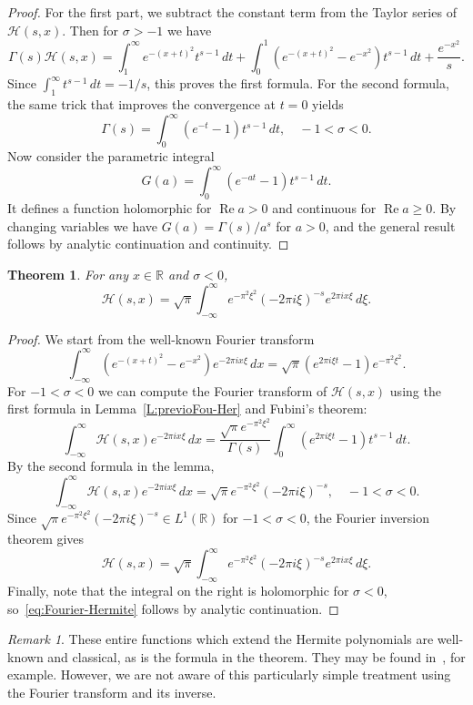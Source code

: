 \documentclass[11pt,a4paper]{amsart}
\newcommand{\R}{\mathbb{R}}
\newcommand{\calH}{\mathcal{H}}
\renewcommand{\Re}{\operatorname{Re}}
\theoremstyle{plain}
\newtheorem{theorem}{Theorem}
\theoremstyle{plain}
\theoremstyle{plain}
\theoremstyle{remark}
\newtheorem*{remark}{Remark}
\begin{document}
\begin{proof}
For the first part, we subtract the constant term from the Taylor series of $\calH(s,x)$. Then for $\sigma > -1$ we have
\[
  \Gamma(s)\calH(s,x) = \int_1^\infty e^{-(x+t)^2}t^{s-1}\,dt
  + \int_0^1 \left(e^{-(x+t)^2}-e^{-x^2}\right)t^{s-1}\,dt + \frac{e^{-x^2}}{s}.
\]
Since $\int_1^\infty t^{s-1}\,dt = -1/s$, this proves the first formula. For the second formula, the same trick that improves the convergence at $t = 0$ yields
\[
  \Gamma(s) = \int_0^\infty (e^{-t}-1)t^{s-1}\,dt,
  \quad -1<\sigma <0.
\]
Now consider the parametric integral
\[
  G(a)=\int_0^\infty (e^{-at}-1)t^{s-1}\,dt.
\]
It defines a function holomorphic for $\Re a> 0$ and continuous for $\Re a\geq 0$. By changing variables we have $G(a)=\Gamma(s)/a^{s}$ for $a>0$, and the general result follows by analytic continuation and continuity.
\end{proof}


\begin{theorem}
\label{T:Fourier-Hermite}
For any $x \in \R$ and $\sigma < 0$,
\begin{equation}
\label{eq:Fourier-Hermite}
  \calH(s,x) = \sqrt{\pi} \int_{-\infty}^\infty e^{-\pi^2\xi^2} (-2\pi i\xi)^{-s}e^{2\pi ix\xi}\,d\xi.
\end{equation}
\end{theorem}

\begin{proof}
We start from the well-known Fourier transform
\[
  \int_{-\infty}^\infty \left(e^{-(x+t)^2}-e^{-x^2}\right)e^{-2\pi ix\xi}\,dx
  = \sqrt{\pi}(e^{2\pi i\xi t}-1)e^{-\pi^2\xi^2}.
\]
For $-1 < \sigma < 0$ we can compute the Fourier transform of $\calH(s,x)$ using the first formula in Lemma~\ref{L:previoFou-Her} and Fubini's theorem:
\[
  \int_{-\infty}^\infty \calH(s,x)e^{-2\pi ix\xi}\,dx
  = \frac{\sqrt{\pi}e^{-\pi^2\xi^2}}{\Gamma(s)} \int_0^\infty (e^{2\pi i\xi t}-1)t^{s-1}\,dt.
\]
By the second formula in the lemma,
\[
  \int_{-\infty}^\infty \calH(s,x)e^{-2\pi ix\xi}\,dx
  = \sqrt{\pi}e^{-\pi^2\xi^2} (-2\pi i\xi)^{-s},
  \quad -1<\sigma<0.
\]
Since $\sqrt{\pi}e^{-\pi^2\xi^2} (-2\pi i\xi)^{-s}\in L^1(\R)$ for $-1 < \sigma < 0$, the Fourier inversion theorem gives
\[
  \calH(s,x) = \sqrt{\pi} \int_{-\infty}^\infty e^{-\pi^2\xi^2} (-2\pi i\xi)^{-s}e^{2\pi ix\xi}\,d\xi.
\]
Finally, note that the integral on the right is holomorphic for $\sigma < 0$, so~\eqref{eq:Fourier-Hermite} follows by analytic continuation.
\end{proof}


\begin{remark}
These entire functions which extend the Hermite polynomials are well-known and classical, as is the formula in the theorem. They may be found in~\cite[Section 10.5]{Le}, for example. However, we are not aware of this particularly simple treatment using the Fourier transform and its inverse.
\end{remark}
\end{document}
